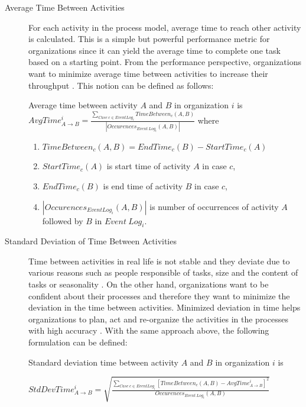 \begin{description}
  \item[Average Time Between Activities] For each activity in the process model, average time to reach other activity is calculated. This is a simple but powerful performance metric for organizations since it can yield the average time to complete one task based on a starting point. From the performance perspective, organizations want to minimize average time between activities to increase their throughput \cite{van2012replaying}. This notion can be defined as follows:
	\theoremstyle{definition}
	\begin{definition}{}
	Average time between activity $A$ and $B$ in organization $i$ is 
	$AvgTime_{A\rightarrow B}^{i} = \frac{\sum_{Case\ c \in Event Log_{i}} TimeBetween_{c}(A,B)}{|Occurences_{Event\ Log_{i}}(A,B)|}$ where
		\begin{enumerate}
			\item $TimeBetween_{c}(A, B) = EndTime_{c}(B) - StartTime_{c}(A)$
			\item $StartTime_{c}(A)$ is start time of activity $A$ in case $c$,
			\item $EndTime_{c}(B)$ is end time of activity $B$ in case $c$,
			\item $|Occurences_{Event Log_{i}}(A, B)|$ is number of occurrences of activity $A$ followed by $B$ in  $Event\ Log_{i}$.
		\end{enumerate}
	\end{definition}

	\item[Standard Deviation of Time Between Activities] Time between activities in real life is not stable and they deviate due to various reasons such as people responsible of tasks, size and the content of tasks or seasonality \cite{van2011process}. On the other hand, organizations want to be confident about their processes and therefore they want to minimize the deviation in the time between activities. Minimized deviation in time helps organizations to plan, act and re-organize the activities in the processes with high accuracy \cite{van2012replaying}. With the same approach above, the following formulation can be defined:
	\theoremstyle{definition}
	\begin{definition}{}
	Standard deviation time between activity $A$ and $B$ in organization $i$ is 

	$StdDevTime_{A\rightarrow B}^{i} = \sqrt{\frac{\sum_{Case\ c \in Event Log_{i}} [TimeBetween_{c}(A, B) - AvgTime_{A\rightarrow B}^{i}]^{2}}{Occurences_{Event\ Log_{i}}(A,B)} }$ 
	\end{definition}
\end{description}

